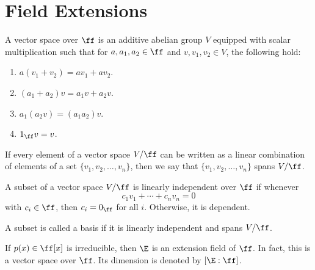 
\section{Field Extensions}

\begin{definition}
    A vector space over $\ff$ is an additive abelian group $V$ equipped with scalar multiplication such that for $a,a_1,a_2\in\ff$ and $v,v_1,v_2\in V$, the following hold:
    \begin{enumerate}
        \item $a(v_1+v_2)=av_1+av_2$.
        \item $(a_1+a_2)v=a_{1}v+a_{2}v$.
        \item $a_1(a_{2}v)=(a_{1}a_2)v$.
        \item $1_\ff v=v$.
    \end{enumerate}
\end{definition}

\begin{definition}[Span]
    If every element of a vector space $V/\ff$ can be written as a linear combination of elements of a set $\{v_1,v_2,\hdots,v_n\}$, then we say that $\{v_1,v_2,\hdots,v_n\}$ spans $V/\ff$.
\end{definition}

\begin{definition}
    A subset of a vector space $V/\ff$ is linearly independent over $\ff$ if whenever
    \[
        c_{1}v_1+\cdots+c_{n}v_n=0
    \]
    with $c_i\in\ff$, then $c_i=0_\ff$ for all $i$.
    Otherwise, it is dependent.
\end{definition}

\begin{definition}[Basis]
    A subset is called a basis if it is linearly independent and spans $V/\ff$.
\end{definition}

\begin{definition}[Dimension]
    If $p(x)\in\ff[x]$ is irreducible, then $\E$ is an extension field of $\ff$.
    In fact, this is a vector space over $\ff$.
    Its dimension is denoted by $[\E:\ff]$.
\end{definition}

